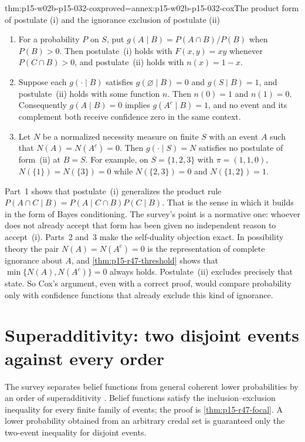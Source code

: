 \begin{hbtheorem}{thm:p15-w02b-p15-032-cox}{proved=annex:p15-w02b-p15-032-cox}{The product form of postulate (i) and the ignorance exclusion of postulate (ii)}
\begin{enumerate}
\item For a probability \(P\) on \(S\), put \(g(A\mid B)=P(A\cap B)/P(B)\)
  when \(P(B)>0\). Then postulate~(i) holds with \(F(x,y)=xy\) whenever
  \(P(C\cap B)>0\), and postulate~(ii) holds with \(n(x)=1-x\).
\item Suppose each \(g(\cdot\mid B)\) satisfies \(g(\varnothing\mid B)=0\)
  and \(g(S\mid B)=1\), and postulate~(ii) holds with some function \(n\).
  Then \(n(0)=1\) and \(n(1)=0\). Consequently \(g(A\mid B)=0\) implies
  \(g(A^c\mid B)=1\), and no event and its complement both receive
  confidence zero in the same context.
\item Let \(N\) be a normalized necessity measure on finite \(S\) with an
  event \(A\) such that \(N(A)=N(A^c)=0\). Then \(g(\cdot\mid S)=N\) satisfies
  no postulate of form~(ii) at \(B=S\). For example, on \(S=\{1,2,3\}\)
  with \(\pi=(1,1,0)\), \(N(\{1\})=N(\{3\})=0\) while
  \(N(\{2,3\})=0\) and \(N(\{1,2\})=1\).
\end{enumerate}
\end{hbtheorem}

Part~1 shows that postulate~(i) generalizes the product rule
\(P(A\cap C\mid B)=P(A\mid C\cap B)P(C\mid B)\). That is the sense in which
it builds in the form of Bayes conditioning. The survey's point is a
normative one: whoever does not already accept that form has been given
no independent reason to accept~(i). Parts~2 and~3 make the self-duality
objection exact. In possibility theory the pair \(N(A)=N(A^c)=0\) is the
representation of complete ignorance about \(A\), and
\cref{thm:p15-r47-threshold} shows that \(\min\{N(A),N(A^c)\}=0\) always holds.
Postulate~(ii) excludes precisely that state. So Cox's argument, even with
a correct proof, would compare probability only with confidence functions
that already exclude this kind of ignorance.

\section{Superadditivity: two disjoint events against every order}
\label{sec:p15-w02b-p15-032-superadditivity}

The survey separates belief functions from general coherent lower
probabilities by an order of superadditivity
\cite[p.~313]{DuboisPrade2021RepresentingBelief}. Belief functions satisfy
the inclusion--exclusion inequality for every finite family of events; the
proof is \cref{thm:p15-r47-focal}. A lower probability obtained from an
arbitrary credal set is guaranteed only the two-event inequality for
disjoint events.

